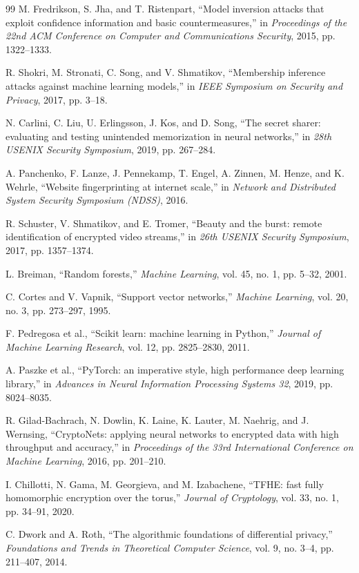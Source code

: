 \documentclass[12pt,a4paper]{article}
\begin{document}
\begin{thebibliography}{99}
M. Fredrikson, S. Jha, and T. Ristenpart,
``Model inversion attacks that exploit confidence information and basic countermeasures,''
in \textit{Proceedings of the 22nd ACM Conference on Computer and Communications Security}, 2015, pp. 1322--1333.

R. Shokri, M. Stronati, C. Song, and V. Shmatikov,
``Membership inference attacks against machine learning models,''
in \textit{IEEE Symposium on Security and Privacy}, 2017, pp. 3--18.

N. Carlini, C. Liu, U. Erlingsson, J. Kos, and D. Song,
``The secret sharer: evaluating and testing unintended memorization in neural networks,''
in \textit{28th USENIX Security Symposium}, 2019, pp. 267--284.

A. Panchenko, F. Lanze, J. Pennekamp, T. Engel, A. Zinnen, M. Henze, and K. Wehrle,
``Website fingerprinting at internet scale,''
in \textit{Network and Distributed System Security Symposium (NDSS)}, 2016.

R. Schuster, V. Shmatikov, and E. Tromer,
``Beauty and the burst: remote identification of encrypted video streams,''
in \textit{26th USENIX Security Symposium}, 2017, pp. 1357--1374.

L. Breiman,
``Random forests,''
\textit{Machine Learning}, vol. 45, no. 1, pp. 5--32, 2001.

C. Cortes and V. Vapnik,
``Support vector networks,''
\textit{Machine Learning}, vol. 20, no. 3, pp. 273--297, 1995.

F. Pedregosa et al.,
``Scikit learn: machine learning in Python,''
\textit{Journal of Machine Learning Research}, vol. 12, pp. 2825--2830, 2011.

A. Paszke et al.,
``PyTorch: an imperative style, high performance deep learning library,''
in \textit{Advances in Neural Information Processing Systems 32}, 2019, pp. 8024--8035.

R. Gilad-Bachrach, N. Dowlin, K. Laine, K. Lauter, M. Naehrig, and J. Wernsing,
``CryptoNets: applying neural networks to encrypted data with high throughput and accuracy,''
in \textit{Proceedings of the 33rd International Conference on Machine Learning}, 2016, pp. 201--210.

I. Chillotti, N. Gama, M. Georgieva, and M. Izabachene,
``TFHE: fast fully homomorphic encryption over the torus,''
\textit{Journal of Cryptology}, vol. 33, no. 1, pp. 34--91, 2020.

C. Dwork and A. Roth,
``The algorithmic foundations of differential privacy,''
\textit{Foundations and Trends in Theoretical Computer Science}, vol. 9, no. 3--4, pp. 211--407, 2014.

\end{thebibliography}
\end{document}
